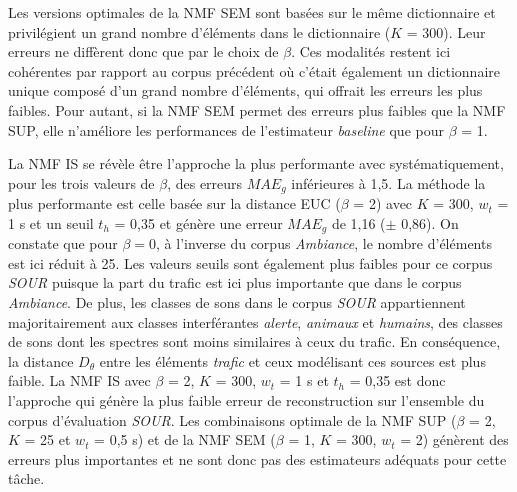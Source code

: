 Les versions optimales de la NMF SEM sont basées sur le même dictionnaire et privilégient un grand nombre d'éléments dans le dictionnaire ($K$ = 300). Leur erreurs ne diffèrent donc que par le choix de $\beta$. Ces modalités restent ici cohérentes par rapport au corpus précédent où c'était également un dictionnaire unique composé d'un grand nombre d'éléments, qui offrait les erreurs les plus faibles. Pour autant, si la NMF SEM permet des erreurs plus faibles que la NMF SUP, elle n'améliore les performances de l'estimateur \textit{baseline} que pour $\beta$ = 1.  

La NMF IS se révèle être l'approche la plus performante avec systématiquement, pour les trois valeurs de $\beta$, des erreurs $MAE_g$ inférieures à 1,5. La méthode la plus performante est celle basée sur la distance EUC ($\beta$ = 2) avec $K$ = 300, $w_t$ = 1 s et un seuil $t_h$ = 0,35 et génère une erreur $MAE_g$ de 1,16 ($\pm$ 0,86). On constate que pour $\beta = 0$, à l'inverse du corpus \textit{Ambiance}, le nombre d'éléments est ici réduit à 25. 
Les valeurs seuils sont également plus faibles pour ce corpus \textit{SOUR} puisque la part du trafic est ici plus importante que dans le corpus \textit{Ambiance}. De plus, les classes de sons dans le corpus \textit{SOUR} appartiennent majoritairement aux classes interférantes \textit{alerte}, \textit{animaux} et \textit{humains}, des classes de sons dont les spectres sont moins similaires à ceux du trafic. En conséquence, la distance $D_{\theta}$ entre les éléments \textit{trafic} et ceux modélisant ces sources est plus faible. 
La NMF IS avec $\beta$ = 2, $K$ = 300, $w_t$ = 1 s et $t_h$ = 0,35 est donc l'approche qui génère la plus faible erreur de reconstruction sur l'ensemble du corpus d'évaluation \textit{SOUR}. Les combinaisons optimale de la NMF SUP ($\beta$ = 2, $K$ = 25 et $w_t$ = 0,5 s) et de la NMF SEM ($\beta$ = 1, $K$ = 300, $w_t$ = 2) génèrent des erreurs plus importantes et ne sont donc pas des estimateurs adéquats pour cette tâche.

